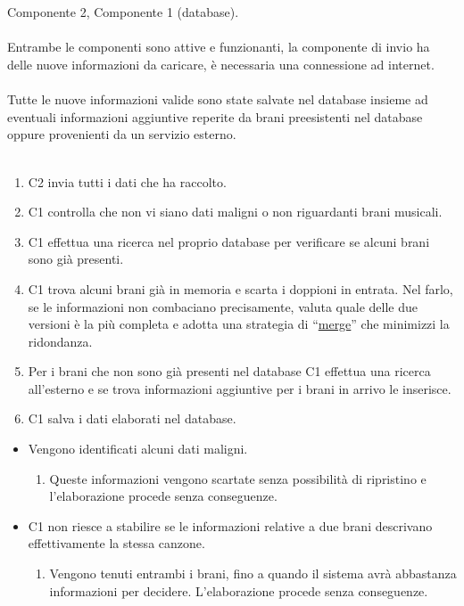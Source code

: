 \newpage
\vspace*{0.5cm}
\\\\
 Componente 2, Componente 1 (database). \\\\
 Entrambe le componenti sono attive e funzionanti, la
componente di invio ha delle nuove informazioni da caricare, \`e necessaria una
connessione ad internet. \\\\ 
 Tutte le nuove informazioni valide sono state salvate
nel database insieme ad eventuali informazioni aggiuntive reperite da brani
preesistenti nel database oppure provenienti da un servizio esterno. \\\\
\begin{enumerate}
  \item C2 invia tutti i dati che ha raccolto.
  \item C1 controlla che non vi siano dati maligni o non riguardanti brani
  musicali.
  \item C1 effettua una ricerca nel proprio database per verificare se alcuni
  brani sono gi\`a presenti.
  \item C1 trova alcuni brani gi\`a in memoria e scarta i doppioni in entrata. Nel
  farlo, se le informazioni non combaciano precisamente, valuta quale delle due
  versioni \`e la pi\`u completa e adotta una strategia di ``\underline{merge}'' che minimizzi
  la ridondanza.
  \item Per i brani che non sono gi\`a presenti nel database C1 effettua una
  ricerca all'esterno e se trova informazioni aggiuntive per i brani in arrivo le inserisce.
  \item C1 salva i dati elaborati nel database.
\end{enumerate}
\begin{itemize}
  \item Vengono identificati alcuni dati maligni.
  \begin {enumerate}
    \item Queste informazioni vengono scartate senza possibilit\`a di ripristino e
    l'elaborazione procede senza conseguenze.
  \end{enumerate}
  \item C1 non riesce a stabilire se le informazioni relative a due brani
  descrivano effettivamente la stessa canzone.
  \begin {enumerate}
    \item Vengono tenuti entrambi i brani, fino a quando il sistema avr\`a
    abbastanza informazioni per decidere. L'elaborazione procede senza
    conseguenze.
  \end{enumerate}
\end{itemize}
\newpage


